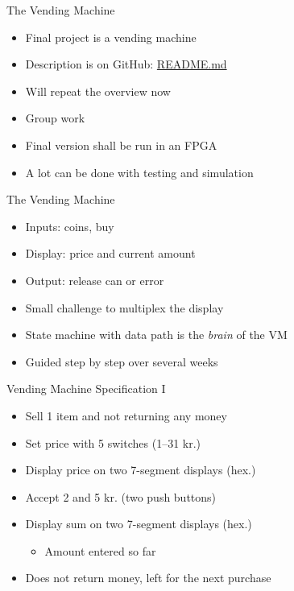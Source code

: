 \begin{frame}[fragile]{The Vending Machine}
\begin{itemize}
\item Final project is a vending machine
\item Description is on GitHub: \href{https://github.com/schoeberl/chisel-lab/tree/master/vending}{README.md}
\item Will repeat the overview now
\item Group work
\item Final version shall be run in an FPGA
\item A lot can be done with testing and simulation
\end{itemize}
\end{frame}

\begin{frame}[fragile]{The Vending Machine}
\begin{itemize}
\item Inputs: coins, buy
\item Display: price and current amount
\item Output: release can or error
\item Small challenge to multiplex the display
\item State machine with data path is the \emph{brain} of the VM
\item Guided step by step over several weeks
\end{itemize}
\end{frame}

\begin{frame}[fragile]{Vending Machine Specification I}
\begin{itemize}
\item Sell 1 item and not returning any money
\item Set price with 5 switches (1--31 kr.)
\item Display price on two 7-segment displays (hex.)
\item Accept 2 and 5 kr. (two push buttons)
\item Display sum on two 7-segment displays (hex.)
\begin{itemize}
\item Amount entered so far
\end{itemize}
\item Does not return money, left for the next purchase
\end{itemize}
\end{frame}


